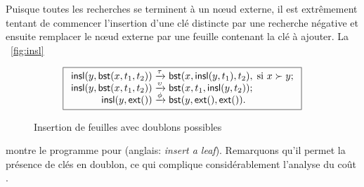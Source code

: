 Puisque toutes les recherches se terminent à un nœud externe, il
est extrêmement tentant de commencer l'insertion d'une clé distincte
par une recherche négative et ensuite remplacer le nœud externe
par une feuille contenant la clé à ajouter. La \fig~\vref{fig:insl}
\begin{figure}
\begin{equation*}
\boxed{
\begin{array}{r@{\;}l@{\;}l}
\fun{insl}(y,\fun{bst}(x,t_1,t_2)) & \xrightarrow{\smash{\tau}} &
  \fun{bst}(x,\fun{insl}(y,t_1),t_2), \; \text{si \(x \succ y\)};\\
\fun{insl}(y,\fun{bst}(x,t_1,t_2)) & \xrightarrow{\smash{\upsilon}} &
  \fun{bst}(x,t_1,\fun{insl}(y,t_2));\\
\fun{insl}(y,\fun{ext}()) & \xrightarrow{\smash{\phi}} & \fun{bst}(y,\fun{ext}(),\fun{ext}()).
\end{array}}
\end{equation*}
\caption{Insertion de feuilles avec doublons possibles}
\label{fig:insl}
\end{figure}
montre le programme pour 
(anglais: \emph{insert a leaf}). Remarquons qu'il permet la présence
de clés en doublon, ce qui complique considérablement l'analyse du
coût \citep{Burge_1976,ArchibaldClement_2006,Pasanen_2010}.

